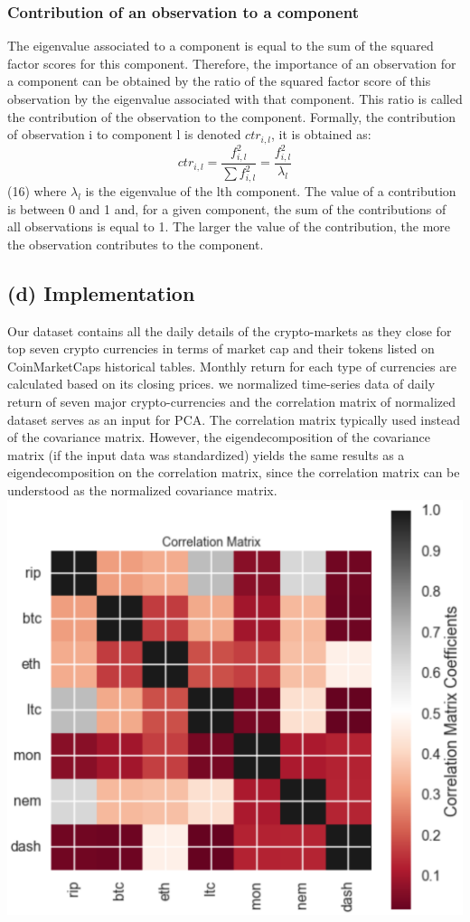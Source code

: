 \documentclass[12pt,twoside]{article}
\begin{document}
\subsubsection*{Contribution of an observation to a component}

The eigenvalue associated to a component is equal to the sum of the squared factor scores for this component. Therefore, the importance of an observation for a component can be obtained by the ratio of the squared factor score of this observation by the eigenvalue associated with that component. This ratio is called the contribution of the observation to the component. Formally, the contribution of observation i to component l is denoted $ ctr_{i,l}$, it is obtained as:
$$ ctr_{i,l} = \frac{f^2_{i,l} }{\sum f^2_{i,l}} = \frac{f^2_{i,l} }{\lambda_{l}} $$  \hfill (16)
where $\lambda_{l}$ is the eigenvalue of the lth component. The value of a contribution is between 0 and 1 and, for a given component, the sum of the contributions of all observations is equal to 1. The larger the value of the contribution, the more the observation contributes to the component. 

\subsection*{(d) Implementation}

Our dataset contains all the daily details of the crypto-markets as they close for top seven crypto currencies in terms of market cap and their tokens listed on CoinMarketCaps historical tables. Monthly return for each type of currencies are calculated based on its closing prices.
\bigbreak
we normalized time-series data of daily return of seven major crypto-currencies and the correlation matrix of normalized dataset serves as an input for PCA. The correlation matrix typically used instead of the covariance matrix. However, the eigendecomposition of the covariance matrix (if the input data was standardized) yields the same results as a eigendecomposition on the correlation matrix, since the correlation matrix can be understood as the normalized covariance matrix.
\bigbreak
\includegraphics[scale=.7]{corr.png}
\bigbreak
\end{document}
